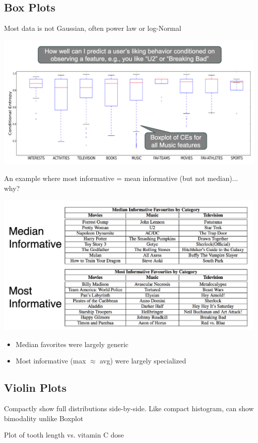 \documentclass[11pt]{article}
\theoremstyle{definition}
\begin{document}
\subsection{Box Plots}
Most data is not Gaussian, often power law or log-Normal

\includegraphics[width=\textwidth]{21.png}

An example where most informative = mean
informative (but not median)... why?

\includegraphics[width=\textwidth]{22.png}
\begin{itemize}
  \item Median favorites were largely generic
  \item Most informative (max $\approx$ avg) were largely specialized
\end{itemize}
\subsection{Violin Plots}
Compactly show full distributions side-by-side. Like compact histogram, can show bimodality unlike Boxplot

Plot of tooth length vs. vitamin C dose
\end{document}

